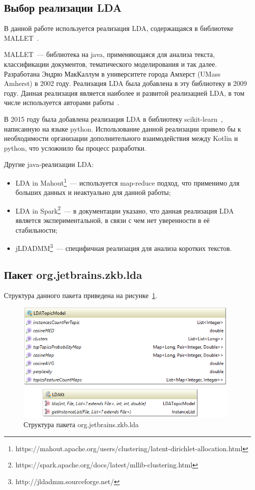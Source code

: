 \subsection{Выбор реализации LDA}
\label{sec:lda_choose}

В данной работе используется реализация LDA, содержащаяся в библиотеке MALLET~\cite{MALLET}.

MALLET~--- библиотека на java, применяющаяся для анализа текста, классификации документов, тематического моделирования и так далее. Разработана Эндрю МакКаллум в университете города Амхерст (UMass Amherst) в 2002 году.  Реализация LDA была добавлена в эту библиотеку в 2009 году. Данная реализация является наиболее  и развитой реализацией LDA, в том числе используется авторами работы~\cite{original}.

В 2015 году была добавлена реализация LDA в библиотеку \mbox{scikit-learn}~\cite{scikit-learn-lda}, написанную на языке python. Использование данной реализации привело бы к необходимости организации дополнительного взаимодействия между Kotlin и python, что усложнило бы процесс разработки.

Другие java-реализации LDA:
\begin{itemize}
\item LDA in Mahout\footnote{https://mahout.apache.org/users/clustering/latent-dirichlet-allocation.html}~--- используется map-reduce подход, что применимо для больших данных и неактуально для данной работы;
\item LDA in Spark\footnote{https://spark.apache.org/docs/latest/mllib-clustering.html}~--- в документации указано, что данная реализация LDA является экспериментальной, в связи с чем нет уверенности в её стабильности;
\item jLDADMM\footnote{http://jldadmm.sourceforge.net/}~--- специфичная реализация для анализа коротких текстов.
\end{itemize}

\subsection{Пакет org.jetbrains.zkb.lda}

Структура данного пакета приведена на рисунке~\ref{fig:lda}.

\begin{figure}[tph!]
\centerline{\includegraphics[width=11cm]{fig/lda.png}}
    \caption{Структура пакета org.jetbrains.zkb.lda}
    \label{fig:lda}
\end{figure}

